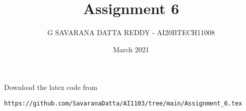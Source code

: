 \documentclass[journal,12pt,twocolumn]{IEEEtran}
\date{March 2021}
\DeclareMathOperator*{\Res}{Res}
\begin{document}
\theoremstyle{definition}
\newtheorem{definition}{Definition}[section]

\newcommand{\BEQA}{\begin{eqnarray}}
\newcommand{\EEQA}{\end{eqnarray}}
\newcommand{\define}{\stackrel{\triangle}{=}}

\raggedbottom
\setlength{\parindent}{0pt}
\providecommand{\mbf}{\mathbf}
\providecommand{\pr}[1]{\ensuremath{\Pr\left(#1\right)}}
\providecommand{\qfunc}[1]{\ensuremath{Q\left(#1\right)}}
\providecommand{\fn}[1]{\ensuremath{f\left(#1\right)}}
\providecommand{\e}[1]{\ensuremath{E\left(#1\right)}}
\providecommand{\sbrak}[1]{\ensuremath{{}\left[#1\right]}}
\providecommand{\lsbrak}[1]{\ensuremath{{}\left[#1\right.}}
\providecommand{\rsbrak}[1]{\ensuremath{{}\left.#1\right]}}
\providecommand{\brak}[1]{\ensuremath{\left(#1\right)}}
\providecommand{\lbrak}[1]{\ensuremath{\left(#1\right.}}
\providecommand{\rbrak}[1]{\ensuremath{\left.#1\right)}}
\providecommand{\cbrak}[1]{\ensuremath{\left\{#1\right\}}}
\providecommand{\lcbrak}[1]{\ensuremath{\left\{#1\right.}}
\providecommand{\rcbrak}[1]{\ensuremath{\left.#1\right\}}}
\theoremstyle{remark}
\newtheorem{rem}{Remark}
\newcommand{\sgn}{\mathop{\mathrm{sgn}}}
\providecommand{\abs}[1]{\vert#1\vert}
\providecommand{\res}[1]{\Res\displaylimits_{#1}} 
\providecommand{\norm}[1]{\lVert#1\rVert}
\providecommand{\mtx}[1]{\mathbf{#1}}
\providecommand{\mean}[1]{E[ #1 ]}
\providecommand{\fourier}{\overset{\mathcal{F}}{ \rightleftharpoons}}
\providecommand{\system}{\overset{\mathcal{H}}{ \longleftrightarrow}}
\newcommand{\solution}{\noindent \textbf{Solution: }}
\newcommand{\cosec}{\,\text{cosec}\,}
\providecommand{\dec}[2]{\ensuremath{\overset{#1}{\underset{#2}{\gtrless}}}}
\newcommand{\myvec}[1]{\ensuremath{\begin{pmatrix}#1\end{pmatrix}}}
\newcommand{\mydet}[1]{\ensuremath{\begin{vmatrix}#1\end{vmatrix}}}
\makeatletter
\vspace{3cm}
\title{Assignment 6}
\author{G SAVARANA DATTA REDDY - AI20BTECH11008}
\maketitle
\newpage
\bigskip
\renewcommand{\thetable}{\theenumi}
Download the latex code from 
\begin{lstlisting}
https://github.com/SavaranaDatta/AI1103/tree/main/Assignment_6.tex
\end{lstlisting}
\end{document}

